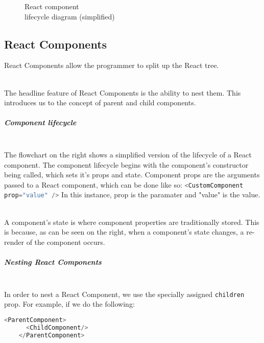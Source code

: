 \documentclass[../../main.tex]{subfiles}
\begin{document}
\begin{dummyenv}
\begin{wrapfigure}{r}[25pt]{0.4\textwidth}
\begin{framed}{}
{
      }

      \caption{
        \centering
        React component\\
        lifecycle diagram (simplified)
      }
    \end{framed}
    \label{fig:wrapfig}
  \end{wrapfigure}

  \paragraph{} %

  \pagebreak

  \subsection{React Components}

  \noindent React Components allow the programmer to split up the React tree.

  \noindent \\ The headline feature of React Components is
  the ability to nest them. This introduces us to the concept
  of parent and child components.

  \subparagraph{Component lifecycle\\}

  \noindent \\ The flowchart on the right shows a simplified version of the lifecycle
  of a React component. The component lifecycle begins with the component's constructor
  being called, which sets it's props and state. Component props are the arguments passed to
  a React component, which can be done like so:
  \lstinline[language=typescript]{<CustomComponent prop="value" />}
  In this instance, prop is the paramater and "value" is the value.

  \noindent \\ A component's state is where component properties are traditionally stored.
  This is because, as can be seen on the right, when a component's state changes, a re-render
  of the component occurs.

  \subparagraph{Nesting React Components\\}

  \noindent \\ In order to nest a React Component, we use the specially assigned
  \lstinline{children} prop. For example, if we do the following:

  \begin{lstlisting}[language=typescript]
    <ParentComponent>
      <ChildComponent/>
    </ParentComponent>
  \end{lstlisting}
\end{dummyenv}
\end{document}
